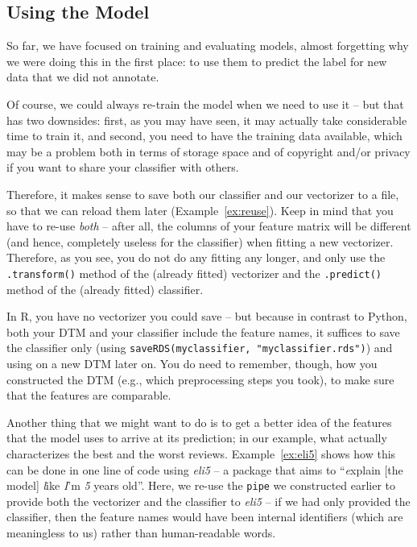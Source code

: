 \subsection{Using the Model}

So far, we have focused on training and evaluating models, almost
forgetting why we were doing this in the first place: to use them to
predict the label for new data that we did not annotate.

Of course, we could always re-train the model when we need to use it
-- but that has two downsides: first, as you may have seen, it may
actually take considerable time to train it, and second, you need to
have the training data available, which may be a problem both in terms
of storage space and of copyright and/or privacy if you want to share
your classifier with others.

Therefore, it makes sense to save both our classifier and our
vectorizer to a file, so that we can reload them later
(Example~\ref{ex:reuse}). Keep in mind that you have to re-use \emph{both}
-- after all, the columns of your feature matrix will be different (and hence, completely useless for the classifier) when
fitting a new vectorizer. Therefore, as you see, you do not do any fitting any longer, and only use the \verb|.transform()| method of the (already fitted) vectorizer and the \verb|.predict()| method of the (already fitted) classifier.

In R, you have no vectorizer you could save -- but because in contrast to Python, both your DTM and your classifier include the feature names, it suffices to save the classifier only (using \verb+saveRDS(myclassifier, "myclassifier.rds")+) and using on a new DTM later on. You do need to remember, though, how you constructed the DTM (e.g., which preprocessing steps you took), to make sure that the features are comparable.




Another thing that we might want to do is to get a better idea of the
features that the model uses to arrive at its prediction; in our
example, what actually characterizes the best and the worst
reviews. Example~\ref{ex:eli5} shows how this can be done in one line of code
using \emph{eli5} -- a package that aims to ``\emph{e}xplain [the model]
\emph{l}ike \emph{I}'m \emph{5} years old''. Here, we re-use the
\verb|pipe| we constructed earlier to provide both the vectorizer and the
classifier to  \emph{eli5} -- if we had only provided the
classifier, then the feature names would have been internal
identifiers (which are meaningless to us) rather than human-readable
words.

